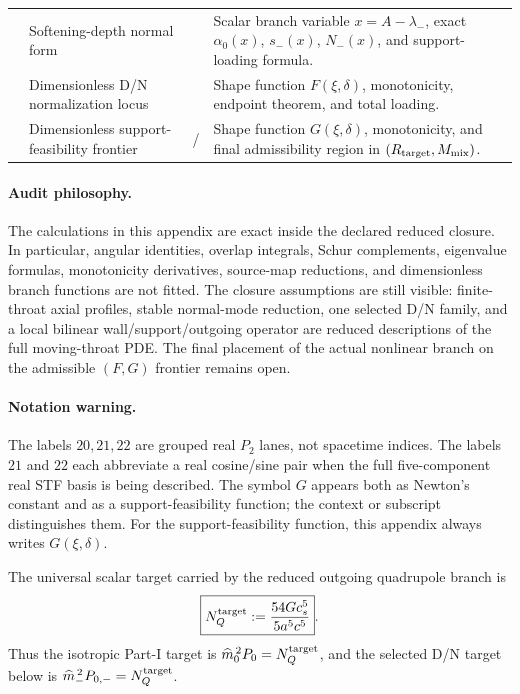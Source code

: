 \begin{longtable}{@{}L{0.10\textwidth}L{0.29\textwidth}L{0.22\textwidth}L{0.33\textwidth}@{}}
 & Softening-depth normal form & \StatusExactClosure{} & Scalar branch variable \(x=A-\lambda_-\), exact \(\alpha_0(x)\), \(s_-(x)\), \(N_-(x)\), and support-loading formula. \\
 & Dimensionless D/N normalization locus & \StatusExactClosure{} & Shape function \(F(\xi,\delta)\), monotonicity, endpoint theorem, and total loading. \\
 & Dimensionless support-feasibility frontier & \StatusExactClosure{} / \StatusOpen{} & Shape function \(G(\xi,\delta)\), monotonicity, and final admissibility region in \((R_{\rm target},M_{\rm mix})\). \\
\bottomrule
\end{longtable}

\paragraph{Audit philosophy.}
The calculations in this appendix are exact inside the declared reduced closure.  In particular, angular identities, overlap integrals, Schur complements, eigenvalue formulas, monotonicity derivatives, source-map reductions, and dimensionless branch functions are not fitted.  The closure assumptions are still visible: finite-throat axial profiles, stable normal-mode reduction, one selected D/N family, and a local bilinear wall/support/outgoing operator are reduced descriptions of the full moving-throat PDE.  The final placement of the actual nonlinear branch on the admissible \((F,G)\) frontier remains open.

\paragraph{Notation warning.}
The labels \(20,21,22\) are grouped real \(P_2\) lanes, not spacetime indices.  The labels \(21\) and \(22\) each abbreviate a real cosine/sine pair when the full five-component real STF basis is being described.  The symbol \(G\) appears both as Newton's constant and as a support-feasibility function; the context or subscript distinguishes them.  For the support-feasibility function, this appendix always writes \(G(\xi,\delta)\).

\begin{definition}
\label{def:app-part02-NQ-target}
The universal scalar target carried by the reduced outgoing quadrupole branch is
\begin{equation}
\label{eq:app-part02-NQ-target}
\boxed{
N_Q^{\rm target}:=\frac{54G c_s^5}{5a^5c^5}}.
\end{equation}
Thus the isotropic Part-I target is \(\widehat m_0^{\,2}P_0=N_Q^{\rm target}\), and the selected D/N target below is \(\widehat m_-^{\,2}P_{0,-}=N_Q^{\rm target}\).
\end{definition}

